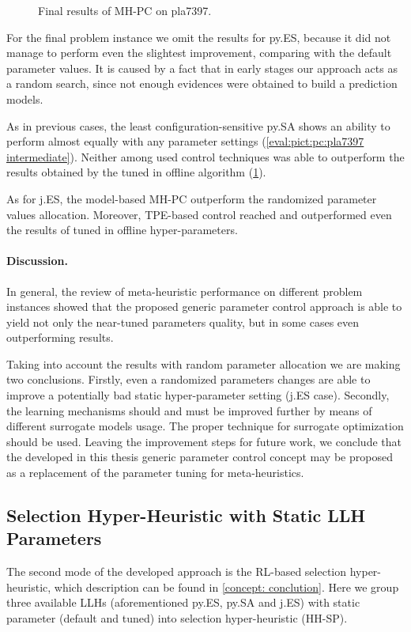 \begin{figure}[b]
	\centering
	\vspace{-20pt}
	
	\caption{Final results of MH-PC on pla7397.}
	\vspace{-5pt}
	\label{eval:pict:pc:pla7397 final}
\end{figure}

For the final problem instance we omit the results for py.ES, because it did not manage to perform even the slightest improvement, comparing with the default parameter values. It is caused by a fact that in early stages our approach acts as a random search, since not enough evidences were obtained to build a prediction models.

As in previous cases, the least configuration-sensitive py.SA shows an ability to perform almost equally with any parameter settings (\cref{eval:pict:pc:pla7397 intermediate}). Neither among used control techniques was able to outperform the results obtained by the tuned in offline algorithm (\cref{eval:pict:pc:pla7397 final}). 

As for j.ES, the model-based MH-PC outperform the randomized parameter values allocation. Moreover, TPE-based control reached and outperformed even the results of tuned in offline hyper-parameters.

\paragraph{Discussion.} In general, the review of meta-heuristic performance on different problem instances showed that the proposed generic parameter control approach is able to yield not only the near-tuned parameters quality, but in some cases even outperforming results.

Taking into account the results with random parameter allocation we are making two conclusions. Firstly, even a randomized parameters changes are able to improve a potentially bad static hyper-parameter setting (j.ES case). Secondly, the learning mechanisms should and must be improved further by means of different surrogate models usage. The proper technique for surrogate optimization should be used. Leaving the improvement steps for future work, we conclude that the developed in this thesis generic parameter control concept may be proposed as a replacement of the parameter tuning for meta-heuristics.


\subsection{Selection Hyper-Heuristic with Static LLH Parameters}\label{eval:1:hh-sp}
The second mode of the developed approach is the RL-based selection hyper-heuristic, which description can be found in \cref{concept: conclution}. Here we group three available LLHs (aforementioned py.ES, py.SA and j.ES) with static parameter (default and tuned) into selection hyper-heuristic (HH-SP).

